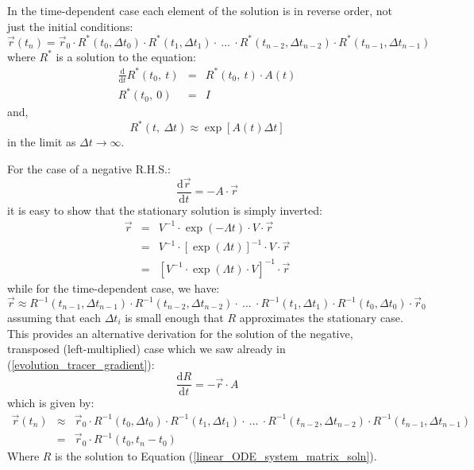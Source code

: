 \documentclass[12pt]{article}
\begin{document}
In the time-dependent case each element of the solution is in reverse order,
not just the initial conditions:
\begin{equation}
\vec r(t_n) = \vec r_0 \cdot R^*(t_0,\Delta t_0) \cdot R^*(t_1, \Delta t_1) \cdot ~ ... 
~ \cdot R^*(t_{n-2},\Delta t_{n-2}) \cdot R^*(t_{n-1},\Delta t_{n-1})
\end{equation}
where $R^*$ is a solution to the equation:
\begin{eqnarray}
\frac{\mathrm d}{\mathrm d t}R^*(t_0,~t) & = & R^*(t_0, ~t) \cdot A(t) \\
R^*(t_0, ~ 0) & = & I
\end{eqnarray}
and,
\begin{equation}
R^*(t,~\Delta t) \approx \exp \left [ A(t) \Delta t \right ]
\end{equation}
in the limit as $\Delta t \rightarrow \infty$.

For the case of a negative R.H.S.:
\begin{equation}
\frac{\mathrm d \vec r}{\mathrm d t} = - A \cdot \vec r
\end{equation}
it is easy to show that the stationary solution is simply inverted:
\begin{eqnarray}
\vec r & = & V^{-1} \cdot \exp (-\Lambda t) \cdot V \cdot \vec r \\
& = & V^{-1} \cdot \left [ \exp (\Lambda t) \right ]^{-1} \cdot V \cdot \vec r \\
& = & \left [V^{-1} \cdot \exp (\Lambda t) \cdot V \right]^{-1} \cdot \vec r 
\end{eqnarray}
while for the time-dependent case, we have:
\begin{equation}
\vec r \approx R^{-1}(t_{n-1},\Delta t_{n-1}) \cdot R^{-1}(t_{n-2}, \Delta t_{n-2}) \cdot ~ ... 
~ \cdot R^{-1}(t_1,\Delta t_1) \cdot R^{-1}(t_0,\Delta t_0) \cdot \vec r_0
\end{equation}
assuming that each $\Delta t_i$ is small enough that $R$ approximates the 
stationary case.
This provides an alternative derivation for the solution of the negative,
transposed (left-multiplied) case which we saw already in (\ref{evolution_tracer_gradient}):
\begin{equation}
\frac{\mathrm d R}{\mathrm d t} = -\vec r \cdot A
\end{equation}
which is given by:
\begin{eqnarray}
\vec r(t_n) & \approx & \vec r_0 \cdot R^{-1}(t_0,\Delta t_0) \cdot R^{-1}(t_1, \Delta t_1) \cdot ~ ... 
~ \cdot R^{-1}(t_{n-2},\Delta t_{n-2}) \cdot R^{-1}(t_{n-1},\Delta t_{n-1}) \\
& = & \vec r_0 \cdot R^{-1}(t_0, t_n-t_0)
\end{eqnarray}
Where $R$ is the solution to Equation (\ref{linear_ODE_system_matrix_soln}).
\end{document}
